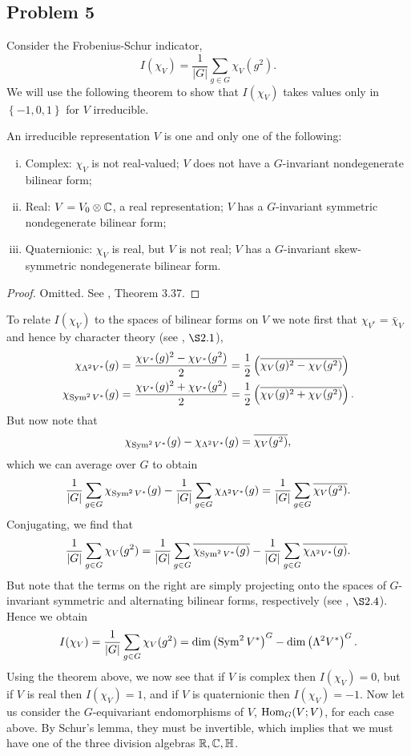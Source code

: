 \documentclass{../../mathnotes}
\begin{document}
\subsection*{Problem 5}

Consider the Frobenius-Schur indicator,
\[I(\chi_V)=\frac{1}{|G|}\sum_{g\in G}\chi_V(g^2).\]
We will use the following theorem to show that $I(\chi_V)$ takes values only in $\left\{ -1,0,1 \right\}$ for $V$ irreducible.
\begin{thm*}
    An irreducible representation $V$ is one and only one of the following:
    \begin{enumerate}[(i)]
        \item Complex: $\chi_V$ is not real-valued; $V$ does not have a $G$-invariant nondegenerate bilinear form;
        \item Real: $V=V_0\otimes \mathbb{C}$, a real representation; $V$ has a $G$-invariant symmetric nondegenerate bilinear form;
        \item Quaternionic: $\chi_V$ is real, but $V$ is not real; $V$ has a $G$-invariant skew-symmetric nondegenerate bilinear form.
    \end{enumerate}
\end{thm*}
\begin{proof}
    Omitted. See \cite{F-H}, Theorem 3.37.
\end{proof}

To relate $I(\chi_V)$ to the spaces of bilinear forms on $V$ we note first that $\chi_{V^*}=\bar\chi_V$ and hence by character theory (see \cite{F-H}, $\S 2.1$),
\begin{align*}
    \chi_{\Lambda^2V^*}(g)&=\frac{\chi_{V^*}(g)^2-\chi_{V^*}(g^2)}{2}=\frac{1}{2}\left(\overline{\chi_{V}(g)^2-\chi_{V}(g^2)}\right)\\
    \chi_{\operatorname{Sym}^2V^*}(g)&=\frac{\chi_{V^*}(g)^2+\chi_{V^*}(g^2)}{2}=\frac{1}{2}\left(\overline{\chi_{V}(g)^2+\chi_{V}(g^2)}\right).
\end{align*}
But now note that
\[\chi_{\operatorname{Sym}^2 V^*}(g)-\chi_{\Lambda^2 V^*}(g)=\overline{\chi_V(g^2)},\]
which we can average over $G$ to obtain
\[\frac{1}{|G|}\sum_{g\in G}\chi_{\operatorname{Sym}^2 V^*}(g)-\frac{1}{|G|}\sum_{g\in G}\chi_{\Lambda^2 V^*}(g)=\frac{1}{|G|}\sum_{g\in G}\overline{\chi_V(g^2)}.\]
Conjugating, we find that
\[\frac{1}{|G|}\sum_{g\in G}\chi_V(g^2)=\frac{1}{|G|}\sum_{g\in G}\overline{\chi_{\operatorname{Sym}^2 V^*}(g)}-\frac{1}{|G|}\sum_{g\in G}\overline{\chi_{\Lambda^2 V^*}(g)}.\]
But note that the terms on the right are simply projecting onto the spaces of $G$-invariant symmetric and alternating bilinear forms, respectively (see \cite{F-H}, $\S2.4$).
Hence we obtain
\[I(\chi_V)=\frac{1}{|G|}\sum_{g\in G}\chi_V(g^2)=\dim\left( \operatorname{Sym}^2 V^* \right)^G-\dim\left( \Lambda^2 V^* \right)^G.\]
Using the theorem above, we now see that if $V$ is complex then $I(\chi_V)=0$, but if $V$ is real then $I(\chi_V)=1$, and if $V$ is quaternionic then
$I(\chi_V)=-1$.
Now let us consider the $G$-equivariant endomorphisms of $V$, $\operatorname{Hom}_G(V;V)$, for each case above. By Schur's lemma, they must be invertible, which 
implies that we must have one of the three division algebras $\mathbb{R},\mathbb{C},\mathbb{H}$.





\end{document}
